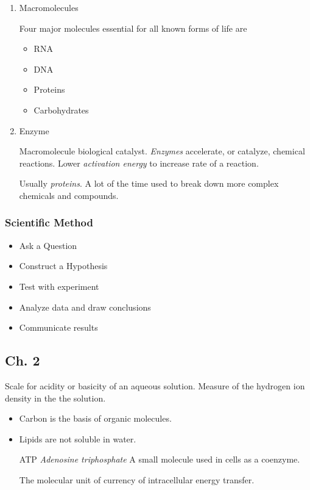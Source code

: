 \documentclass[11pt]{article}
\begin{document}
\begin{enumerate}
\item Macromolecules
\label{sec:orgdb1dc48}

Four major molecules essential for all known forms of life are 

\begin{itemize}
\item RNA
\item DNA
\item Proteins
\item Carbohydrates
\end{itemize}

\item Enzyme
\label{sec:org8e375a1}

Macromolecule biological catalyst. \emph{Enzymes} accelerate, or catalyze,
chemical reactions. Lower \emph{activation energy} to increase rate of a
reaction. 

Usually \emph{proteins}. A lot of the time used to break down more complex
chemicals and compounds.
\end{enumerate}

\subsubsection{Scientific Method}
\label{sec:org9998bb7}
\begin{itemize}
\item Ask a Question
\item Construct a Hypothesis
\item Test with experiment
\item Analyze data and draw conclusions
\item Communicate results
\end{itemize}

\subsection{Ch. 2}
\label{sec:orge0380f5}
Scale for acidity or basicity of an aqueous solution. Measure of the hydrogen
ion density in the the solution.

\begin{itemize}
\item Carbon is the basis of organic molecules.

\item Lipids are not soluble in water.

\item[{ATP}] \emph{Adenosine triphosphate} A small molecule used in cells as a
coenzyme.

The molecular unit of currency of intracellular energy transfer.
\end{itemize}
\end{document}
